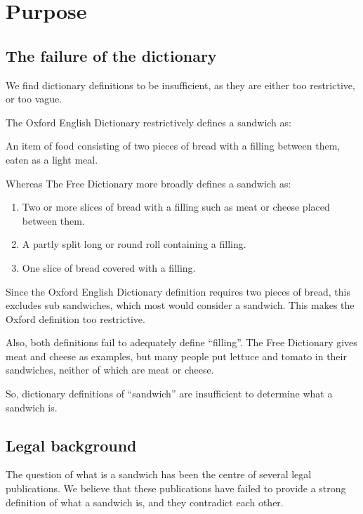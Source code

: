 \chapter{Purpose}

\section{The failure of the dictionary}
We find dictionary definitions to be insufficient, as they are either too restrictive, or too vague.

The Oxford English Dictionary \cite{oxfordDefinition} restrictively defines a sandwich as:

\begin{displayquote}
	An item of food consisting of two pieces of bread with a filling between them, eaten as a light meal.
\end{displayquote}

Whereas The Free Dictionary \cite{freeDefinition} more broadly defines a sandwich as:

\begin{displayquote}
	\begin{enumerate}
		\renewcommand{\theenumi}{\alph{enumi}}
		\item Two or more slices of bread with a filling such as meat or cheese placed between them.
		\item A partly split long or round roll containing a filling.
		\item One slice of bread covered with a filling.
	\end{enumerate}
\end{displayquote}

Since the Oxford English Dictionary definition requires two pieces of bread, this excludes sub sandwiches, which most would consider a sandwich.
This makes the Oxford definition too restrictive.

Also, both definitions fail to adequately define ``filling''.
The Free Dictionary gives meat and cheese as examples, but many people put lettuce and tomato in their sandwiches, neither of which are meat or cheese.

So, dictionary definitions of ``sandwich'' are insufficient to determine what a sandwich is.

\section{Legal background}
The question of what is a sandwich has been the centre of several legal publications.
We believe that these publications have failed to provide a strong definition of what a sandwich is, and they contradict each other.

